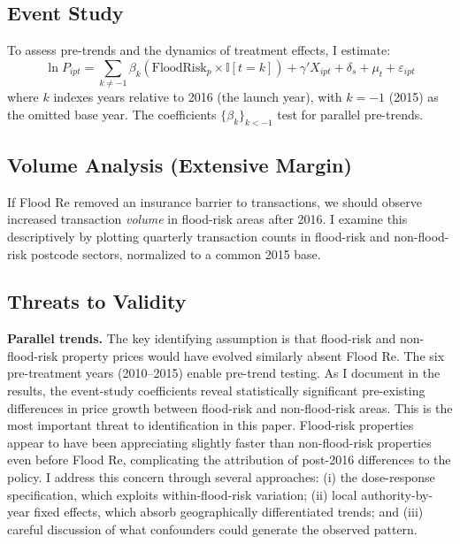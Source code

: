 \documentclass[12pt]{article}
\newcommand{\ind}{\mathbb{I}}
\begin{document}
\subsection{Event Study}

To assess pre-trends and the dynamics of treatment effects, I estimate:
\begin{equation} \label{eq:es}
\ln P_{ipt} = \sum_{k \neq -1} \beta_k (\text{FloodRisk}_p \times \ind[t = k]) + \gamma' X_{ipt} + \delta_s + \mu_t + \varepsilon_{ipt}
\end{equation}
where $k$ indexes years relative to 2016 (the launch year), with $k = -1$ (2015) as the omitted base year. The coefficients $\{\beta_k\}_{k < -1}$ test for parallel pre-trends.

\subsection{Volume Analysis (Extensive Margin)}

If Flood Re removed an insurance barrier to transactions, we should observe increased transaction \textit{volume} in flood-risk areas after 2016. I examine this descriptively by plotting quarterly transaction counts in flood-risk and non-flood-risk postcode sectors, normalized to a common 2015 base.

\subsection{Threats to Validity}

\textbf{Parallel trends.} The key identifying assumption is that flood-risk and non-flood-risk property prices would have evolved similarly absent Flood Re. The six pre-treatment years (2010--2015) enable pre-trend testing. As I document in the results, the event-study coefficients reveal statistically significant pre-existing differences in price growth between flood-risk and non-flood-risk areas. This is the most important threat to identification in this paper. Flood-risk properties appear to have been appreciating slightly faster than non-flood-risk properties even before Flood Re, complicating the attribution of post-2016 differences to the policy. I address this concern through several approaches: (i) the dose-response specification, which exploits within-flood-risk variation; (ii) local authority-by-year fixed effects, which absorb geographically differentiated trends; and (iii) careful discussion of what confounders could generate the observed pattern.
\end{document}
